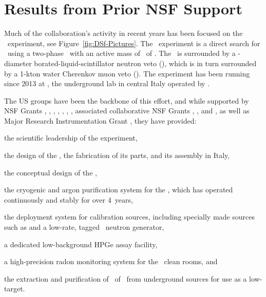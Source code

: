 \section{Results from Prior NSF Support}
\label{sec:PreviousResults}

Much of the collaboration's activity in recent years has been focused on the \DSfs\ experiment, see Figure~\ref{fig:DSf-Pictures}.  The \DSfs\ experiment is a direct search for \WIMPs\ using a two-phase \LArTPC\ with an active mass of \DSfActiveMass\ of \LAr.  The \LArTPC\ is surrounded by a \LSVStainlessSphereDiameter-diameter borated-liquid-scintillator neutron veto (\LSV), which is in turn surrounded by a 1-kton water Cherenkov muon veto (\WCV).  The experiment has been running since 2013 at \LNGS, the underground lab in central Italy operated by \INFN.

The US groups have been the backbone of this effort, and while supported by NSF Grants , , , , , , , associated collaborative NSF Grants , ,  and , as well as Major Research Instrumentation Grant , they have provided:
\begin{compactitem}
\item the scientific leadership of the experiment,
\item the design of the \LArTPC, the fabrication of its parts, and its assembly in Italy,
\item the conceptual design of the \LSV,
\item the cryogenic and argon purification system for the \TPC, which has operated continuously and stably for over 4~years,
\item the deployment system for calibration sources, including specially made sources such as  and a low-rate, tagged \DD\ neutron generator,
\item a dedicated low-background HPGe assay facility, 
\item a high-precision radon monitoring system for the \DSs\ clean rooms, and
\item the extraction and purification of \DSfUArMassDelivered\ of \UAr\ from underground sources for use as a low- target.
\end{compactitem}


